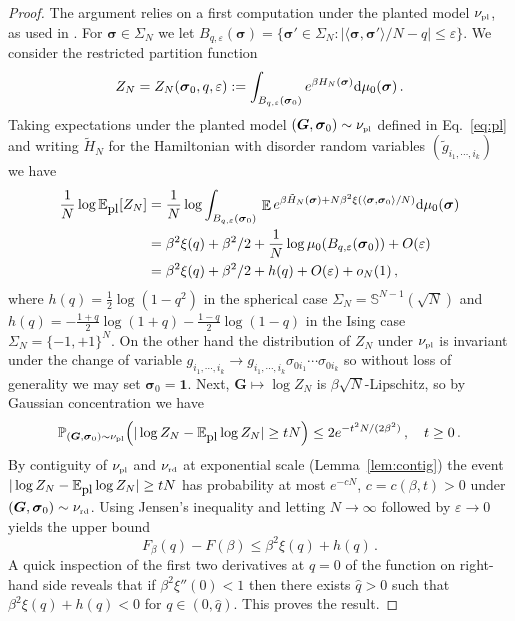 \documentclass[11pt]{article}
\theoremstyle{definition}
\numberwithin{equation}{section}
\newcommand{\<}{\langle}
\renewcommand{\>}{\rangle}
\def\bsigma{{\boldsymbol{\sigma}}}
\def\bbE{{\mathbb{E}}}
\def\pl{\mbox{\rm\tiny pl}}
\def\plsmall{\mbox{\rm\small pl}}
\def\rd{\mbox{\rm\tiny rd}}
\def\de{{\rm d}}
\newcommand{\Sph}{\mathbb{S}}
\def\bG{{\boldsymbol G}}
\def\P{\mathbb{P}}
\DeclareMathOperator*{\E}{\bbE}
\def\eps{\varepsilon}
\def\one{{\mathbf{1}}}
\begin{document}
\begin{proof}
The argument relies on a first computation under the planted model $\nu_{\pl}$, as used in \cite{alaoui2022sampling,alaoui2023shattering}. For $\bsigma \in \Sigma_N$ we let $B_{q,\eps}(\bsigma) = \{\bsigma' \in \Sigma_N : |\langle \bsigma , \bsigma'\rangle/N - q|\le \eps\}$. We consider the restricted partition function
\[Z_N = Z_N(\bsigma_0,q,\eps) := \int_{B_{q,\eps}(\bsigma_0)}  e^{\beta H_{N}(\bsigma)} \de \mu_0(\bsigma)\,. \]
Taking expectations under the planted model $(\bG,\bsigma_0) \sim \nu_{\pl}$ defined in Eq.~\eqref{eq:pl} and writing $\tilde{H}_N$ for the Hamiltonian with disorder random variables $(\tilde{g}_{i_1,\cdots,i_k})$ we have 
\begin{align}
\frac{1}{N} \log \bbE_{\plsmall}[Z_N] &= \frac{1}{N} \log \int_{B_{q,\eps}(\bsigma_0)} \, \E e^{\beta \tilde{H}_{N}(\bsigma) + N\beta^2 \xi(\<\bsigma , \bsigma_0\>/N)} \de \mu_0(\bsigma)\nonumber\\
&= \beta^2\xi(q) + \beta^2/2 + \frac{1}{N} \log \mu_0(B_{q,\eps}(\bsigma_0)) + O(\eps)\nonumber\\
&= \beta^2\xi(q) + \beta^2/2 + h(q) + O(\eps) + o_N(1)\,,\label{eq:firstmoment}
\end{align}
where $h(q) =  \frac{1}{2}\log(1-q^2)$ in the spherical case $\Sigma_N = \Sph^{N-1}(\sqrt{N})$ and $h(q) = -\frac{1+q}{2}\log (1+q) - \frac{1-q}{2}\log (1-q)$ in the Ising case $\Sigma_N = \{-1,+1\}^N$. On the other hand the distribution of $Z_N$ under $\nu_{\pl}$ is invariant under the change of variable $g_{i_1,\cdots,i_k} \to g_{i_1,\cdots,i_k}\sigma_{0i_1}\cdots\sigma_{0i_k}$ so without loss of generality we may set $\bsigma_0 = \one$. Next, $\bG \mapsto \log Z_N$ is $\beta\sqrt{N}$-Lipschitz, so by Gaussian concentration we have
\begin{equation} \label{eq:concentr}
\P_{(\bG,\bsigma_0)\sim \nu_{\pl}}\Big(|\log Z_N - \bbE_{\plsmall}\log Z_N|\ge t N\Big) \le 2e^{-t^2N/(2\beta^2)}\,,~~~ t \ge 0\,.
\end{equation}
By contiguity of $\nu_{\pl}$ and $\nu_{\rd}$ at exponential scale (Lemma~\ref{lem:contig}) the event $|\log Z_N - \bbE_{\plsmall}\log Z_N|\ge t N$ has probability at most $e^{-cN}$, $c = c(\beta,t)>0$ under $(\bG,\bsigma_0) \sim \nu_{\rd}$. Using Jensen's inequality and letting $N \to \infty$ followed by $\eps \to 0$ yields the upper bound
\begin{equation}\label{FP:upbd}
F_{\beta}(q) - F(\beta)\le \beta^2\xi(q) + h(q) \, .
\end{equation}
A quick inspection of the first two derivatives at $q=0$ of the function on right-hand side reveals that if $\beta^2\xi''(0) < 1$ then there exists $\hat{q}>0$ such that $\beta^2\xi(q) + h(q) <0$ for $q \in (0,\hat{q})$. This proves the result.
\end{proof}
\end{document}
